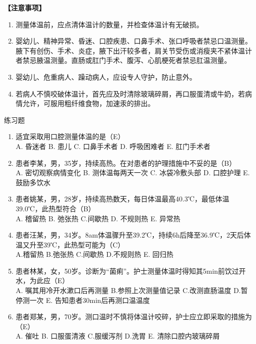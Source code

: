 \documentclass[11pt, a4paper]{ctexart}
\begin{document}
\textbf{【注意事项】}
\begin{enumerate}
    \item 测量体温前，应点清体温计的数量，并检查体温计有无破损。
    \item 婴幼儿、精神异常、昏迷、口腔疾患、口鼻手术、张口呼吸者禁忌口温测量。腋下有创伤、手术、炎症，腋下出汗较多者，肩关节受伤或消瘦夹不紧体温计者禁忌腋温测量。直肠或肛门手术、腹泻、心肌梗死者禁忌肛温测量。
    \item 婴幼儿、危重病人、躁动病人，应设专人守护，防止意外。
    \item 若病人不慎咬破体温计，首先应及时清除玻璃碎屑，再口服蛋清或牛奶，若病情允许，可服用粗纤维食物，加速汞的排出。
\end{enumerate}

\begin{examplebox}{练习题}
\begin{enumerate}
    \item 适宜采取用口腔测量体温的是（E）\\
    A. 昏迷者 \quad B. 患儿 \quad C. 口鼻手术者 \quad D. 呼吸困难者 \quad E. 肛门手术者
    \item 患者李某，男，35岁，持续高热。在对患者的护理措施中不妥的是（B）\\
    A. 密切观察病情变化 \quad B. 测体温每两天一次 \quad C. 冰袋冷敷头部 \quad D. 口腔护理 \quad E. 鼓励多饮水
    \item 患者姚某，男，28岁，持续高热数天，每日体温最高40.3℃，最低体温39.0℃，此热型符合（B）\\
    A. 稽留热 \quad B. 弛张热 \quad C.间歇热 \quad D. 不规则热 \quad E. 异常热
    \item 患者汪某，男，34岁。8am体温骤升至39.2℃，持续6h后降至36.9℃，2天后体温又升至39℃，此热型可能为（C）\\
    A.稽留热 \quad B.弛张热 \quad C.间歇热 \quad D.不规则热 \quad E. 回归热
    \item 患者林某，女，50岁。诊断为“菌痢”。护士测量体温时得知其5min前饮过开水，为此应（E）\\
    A. 嘱其用冷开水漱口后再测量 \quad B.参照上次测量值记录 \quad C.改测直肠温度 \quad D.暂停测一次 \quad E. 告知患者30min后再测口温温度
    \item 患者郑某，男，70岁。测口温时不慎将体温计咬碎，护士应立即采取的措施为（E）\\
    A. 催吐 \quad B. 口服蛋清液 \quad C.服缓泻剂 \quad D.洗胃 \quad E. 清除口腔内玻璃碎屑
\end{enumerate}
\end{examplebox}
\end{document}
